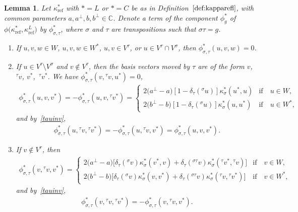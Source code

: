 \documentclass[10pt,a4paper]{amsart}
\numberwithin{equation}{section}
\newtheorem{Lemma}[Theorem]{Lemma}
\newcommand{\actby}[1]{{}^{#1}}
\newcommand{\actbylessspace}[1]{{}^{#1}\!}
\DeclareMathOperator{\refl}{ref}
\begin{document}
\begin{Lemma}\label{lemma:simplification*2L2}
Let $\kappa^*_{\refl}$ with $*=L$ or $*=C$ be as in Definition~$\ref{def:kapparefl}$,
with common parameters $a, a^\perp, b, b^\perp \in \mathbb{C}$.
Denote a term of the component $\phi^*_g$ of $\phi\big(\kappa^*_{\refl},\kappa^L_{\refl}\big)$
by $\phi^*_{\sigma,\tau}$, where $\sigma$ and $\tau$ are transpositions
such that $\sigma \tau = g$.
	\begin{enumerate}[label={$\arabic*.$}]\itemsep=0pt
		\item[$(1)$] %
If $u,v,w \in W$, $u,v,w \in W^*$, $u,v\in V^{\tau}$, or
		$u \in V^{\tau}\cap V^{\sigma}$, then $\phi^{*}_{\sigma,\tau}(u,v,w)=0$.
		\item[$(2)$] %
If $u \in V^{\tau} \setminus V^{\sigma}$ and $v \notin V^\tau$, then the
		basis vectors moved by $\tau$ are of the form $v$, $\actby{\tau}v$, $v^*$,~$\actby{\tau}v^*$.
		We have $\phi^*_{\sigma,\tau}(v,\actbylessspace{\tau}v,u^*)=0$,
		\begin{gather*}
		\phi^*_{\sigma,\tau}(u,v,v^*)
		=-\phi^*_{\sigma,\tau}(u,v,\actbylessspace{\tau}v^*)
		=\begin{cases}
		2\big(a^\perp-a\big)[1-\delta_{\tau}(\actbylessspace{\sigma}u)]\kappa^*_{\sigma}(u^*,u)
& \text{if}\quad u \in W, \\
		2\big(b^\perp-b\big)[1-\delta_{\tau}(\actbylessspace{\sigma}u)]\kappa^*_{\sigma}(u,u^*)
& \text{if}\quad u \in W^*,
		\end{cases}
		\end{gather*}
		and by~\eqref{tauinv},
	\begin{gather*}
\phi^*_{\sigma,\tau}(u,\actby{\tau}v,\actby{\tau}v^*)=-\phi^*_{\sigma,\tau}(u,\actby{\tau}v,v^*) =\phi^*_{\sigma,\tau}(u,v,v^*).
\end{gather*}
		\item[$(3)$] %
If $v \notin V^{\tau}$, then
		\begin{gather*}
		\phi^*_{\sigma,\tau}(v,\actby{\tau}v,v^*)
		=\begin{cases}
		2\big(a^\perp-a\big)\big[\delta_{\tau}(\actbylessspace{\sigma}v)\kappa^*_{\sigma}(v^*,v) +\delta_{\tau}(\actby{\sigma\tau}v)\kappa^*_{\sigma}(\actbylessspace{\tau}v^*,\actbylessspace{\tau}v) \big] & \text{if}\quad v \in W,
\\
2\big(b^\perp-b\big)\big[\delta_{\tau}(\actbylessspace{\sigma}v)\kappa^*_{\sigma}(v,v^*) +\delta_{\tau}(\actby{\sigma\tau}v)\kappa^*_{\sigma}(\actbylessspace{\tau}v,\actbylessspace{\tau}v^*) \big] & \text{if}\quad v \in W^*,
		\end{cases}
		\end{gather*}
		and by~\eqref{tauinv},
		\begin{gather*}
		\phi^*_{\sigma,\tau}(v,\actbylessspace{\tau}v,\actbylessspace{\tau}v^*)
		=-\phi^*_{\sigma,\tau}(v,\actbylessspace{\tau}v,v^*).
		\end{gather*}
	\end{enumerate}
\end{Lemma}
\end{document}
